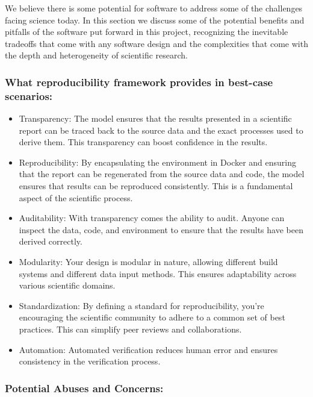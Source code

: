 We believe there is some potential for software to address some of the challenges facing science today. In this section we discuss some of the potential benefits and pitfalls of the software put forward in this project, recognizing the inevitable tradeoffs that come with any software design and the complexities that come with the depth and heterogeneity of scientific research.

\hypertarget{what-reproducibility-framework-provides-in-best-case-scenarios}{%
\subsubsection{What reproducibility framework provides in best-case scenarios:}\label{what-reproducibility-framework-provides-in-best-case-scenarios}}

\begin{itemize}
\itemsep -0.2em
\item Transparency: The model ensures that the results presented in a scientific report can be traced back to the source data and the exact processes used to derive them. This transparency can boost confidence in the results.
\item Reproducibility: By encapsulating the environment in Docker and ensuring that the report can be regenerated from the source data and code, the model ensures that results can be reproduced consistently. This is a fundamental aspect of the scientific process.
\item Auditability: With transparency comes the ability to audit. Anyone can inspect the data, code, and environment to ensure that the results have been derived correctly.
\item Modularity: Your design is modular in nature, allowing different build systems and different data input methods. This ensures adaptability across various scientific domains.
\item Standardization: By defining a standard for reproducibility, you're encouraging the scientific community to adhere to a common set of best practices. This can simplify peer reviews and collaborations.
\item Automation: Automated verification reduces human error and ensures consistency in the verification process.
\end{itemize}

\hypertarget{potential-abuses-and-concerns}{%
\subsubsection{Potential Abuses and Concerns:}\label{potential-abuses-and-concerns}}

